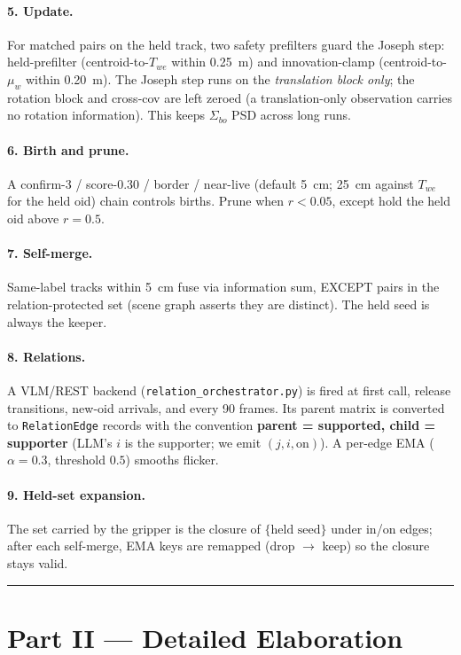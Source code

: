 \documentclass[11pt]{article}
\newcommand{\file}[1]{\texttt{#1}}
\begin{document}
\paragraph{5. Update.} For matched pairs on the held track, two
safety prefilters guard the Joseph step:
held-prefilter (centroid-to-$T_{we}$ within 0.25~m) and
innovation-clamp (centroid-to-$\mu_w$ within 0.20~m). The Joseph step
runs on the \emph{translation block only}; the rotation block and
cross-cov are left zeroed (a translation-only observation carries no
rotation information). This keeps $\Sigma_{bo}$ PSD across long runs.

\paragraph{6. Birth and prune.} A confirm-3 / score-0.30 / border /
near-live (default 5~cm; 25~cm against $T_{we}$ for the held oid)
chain controls births. Prune when $r<0.05$, except hold the held
oid above $r=0.5$.

\paragraph{7. Self-merge.} Same-label tracks within 5~cm fuse via
information sum, EXCEPT pairs in the relation-protected set
(scene graph asserts they are distinct). The held seed is always
the keeper.

\paragraph{8. Relations.} A VLM/REST backend
(\file{relation\_orchestrator.py}) is fired at first call,
release transitions, new-oid arrivals, and every 90 frames. Its
parent matrix is converted to \texttt{RelationEdge} records with the
convention \textbf{parent = supported, child = supporter} (LLM's $i$
is the supporter; we emit $(j,i,\text{on})$). A per-edge EMA
($\alpha=0.3$, threshold $0.5$) smooths flicker.

\paragraph{9. Held-set expansion.} The set carried by the gripper is
the closure of $\{\text{held seed}\}$ under in/on edges; after each
self-merge, EMA keys are remapped (drop $\to$ keep) so the closure
stays valid.

\bigskip\hrule\bigskip

\section*{Part II — Detailed Elaboration}
\label{sec:detail}
\end{document}
